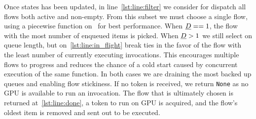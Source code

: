 Once states has been updated, in line~\ref{lst:line:filter} we consider for dispatch all flows both active and non-empty.
From this subset we must choose a single flow, using a piecewise function on \D~for best performance.
When $\emph{D} == 1$, the flow with the most number of enqueued items is picked.
When $\emph{D} > 1$ we still select on queue length, but on~\ref{lst:line:in_flight} break ties in the favor of the flow with the least number of currently executing invocations.
This encourages multiple flows to progress and reduces the chance of a cold start caused by concurrent execution of the same function.
In both cases we are draining the most backed up queues and enabling flow stickiness.
If no token is received, we return \texttt{None} as no GPU is available to run an invocation.
The flow that is ultimately chosen is returned at~\ref{lst:line:done}, a token to run on GPU is acquired, and the flow's oldest item is removed and sent out to be executed.

